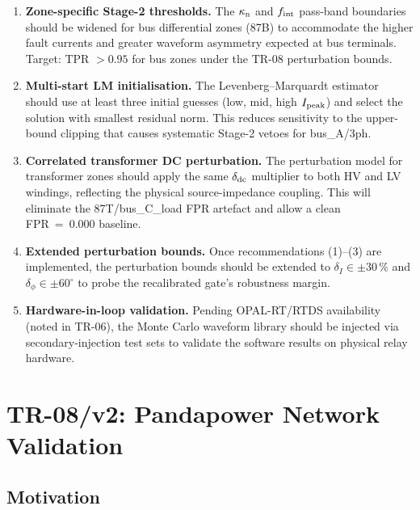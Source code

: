 \documentclass[12pt,a4paper]{article}
\newcommand{\kappan}{\kappa_{\rm n}}
\newcommand{\fint}{f_{\rm int}}
\newcommand{\Ipeak}{I_{\rm peak}}
\begin{document}
\begin{enumerate}
  \item \textbf{Zone-specific Stage-2 thresholds.}
    The $\kappan$ and $\fint$ pass-band boundaries should be widened
    for bus differential zones (87B) to accommodate the higher fault
    currents and greater waveform asymmetry expected at bus terminals.
    Target: TPR $> 0.95$ for bus zones under the TR-08 perturbation
    bounds.

  \item \textbf{Multi-start LM initialisation.}
    The Levenberg--Marquardt estimator should use at least three initial
    guesses (low, mid, high $\Ipeak$) and select the solution with
    smallest residual norm.  This reduces sensitivity to the upper-bound
    clipping that causes systematic Stage-2 vetoes for bus\_A/3ph.

  \item \textbf{Correlated transformer DC perturbation.}
    The perturbation model for transformer zones should apply the same
    $\delta_{\rm dc}$ multiplier to both HV and LV windings, reflecting
    the physical source-impedance coupling.  This will eliminate the
    87T/bus\_C\_load FPR artefact and allow a clean FPR~=~0.000
    baseline.

  \item \textbf{Extended perturbation bounds.}
    Once recommendations (1)--(3) are implemented, the perturbation
    bounds should be extended to $\delta_I \in \pm30\,\%$ and
    $\delta_\phi \in \pm60^\circ$ to probe the recalibrated gate's
    robustness margin.

  \item \textbf{Hardware-in-loop validation.}
    Pending OPAL-RT/RTDS availability (noted in TR-06), the Monte Carlo
    waveform library should be injected via secondary-injection test sets
    to validate the software results on physical relay hardware.
\end{enumerate}


\section{TR-08/v2: Pandapower Network Validation}
\label{sec:v2}

\subsection{Motivation}
\end{document}
